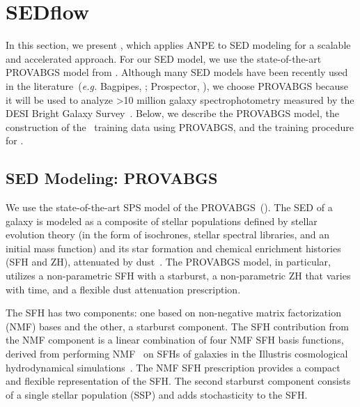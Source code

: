\section{SEDflow} \label{sec:sedflow}
In this section, we present \sedflow, which applies ANPE to SED modeling for a
scalable and accelerated approach.
For our SED model, we use the state-of-the-art PROVABGS model from
\cite{hahn2022}. 
Although many SED models have been recently used in the
literature~(\emph{e.g.} {\sc Bagpipes}, \citealt{carnall2018}; 
{\sc Prospector}, \citealt{leja2017, johnson2021}), we choose PROVABGS because
it will be used to analyze >10 million galaxy spectrophotometry measured by the
DESI Bright Galaxy Survey~\citep{ruiz-macias2021, hahn2022}.
Below, we describe the PROVABGS model, the construction of the
\sedflow~training data using PROVABGS, and the training procedure for \sedflow.

\subsection{SED Modeling: PROVABGS} \label{sec:provabgs}
We use the state-of-the-art SPS model of the
PROVABGS~(). 
The SED of a galaxy is modeled as a composite of stellar populations defined by
stellar evolution theory (in the form of isochrones, stellar spectral
libraries, and an initial mass function) and its star
formation and chemical enrichment histories (SFH and ZH), attenuated by
dust~\citep[see][for a review]{walcher2011, conroy2013}. 
The PROVABGS model, in particular, utilizes a non-parametric SFH with a
starburst, a non-parametric ZH that varies with time, and a flexible dust
attenuation prescription.

The SFH has two components: one based on non-negative matrix factorization
(NMF) bases and the other, a starburst component.
The SFH contribution from the NMF component is a linear combination of four NMF
SFH basis functions, derived from performing NMF~\citep{lee1999, cichocki2009,
fevotte2011} on SFHs of galaxies in the Illustris cosmological hydrodynamical
simulations~\citep{vogelsberger2014, genel2014, nelson2015}.
The NMF SFH prescription provides a compact and flexible representation of the
SFH.
The second starburst component consists of a single stellar population (SSP)
and adds stochasticity to the SFH. 

